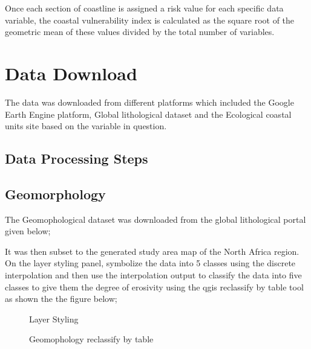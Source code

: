 \documentclass[letterpaper,10pt,english]{sphinxmanual}
\let\sphinxpxdimen\pdfpxdimen\else\newdimen\sphinxpxdimen
\begin{document}
\sphinxAtStartPar
Once each section of coastline is assigned a risk value for each specific data variable, the coastal vulnerability index is calculated as the square root of the geometric mean of these values divided by the total number of variables.


\section{Data Download}
\label{\detokenize{Preprocessing/CVI:data-download}}
\sphinxAtStartPar
The data was downloaded from different platforms which included the Google Earth Engine platform, Global lithological dataset and the Ecological coastal units site based on the variable in question.


\subsection{Data Processing Steps}
\label{\detokenize{Preprocessing/CVI:data-processing-steps}}

\subsection{Geomorphology}
\label{\detokenize{Preprocessing/CVI:geomorphology}}
\sphinxAtStartPar
The Geomophological dataset was downloaded from the global lithological portal given below;

\label{\detokenize{Preprocessing/CVI:datapreparationoverview}}
\sphinxAtStartPar
It was then subset to the generated study area map of the North Africa region.
On the layer styling panel, symbolize the data into 5 classes using the discrete interpolation and then use the interpolation output to classify the data into five classes to give them the degree of erosivity using the qgis reclassify by table tool as shown the the figure below;

\begin{figure}[H]
\centering
\capstart

\noindent{}
\caption{Layer Styling}\label{\detokenize{Preprocessing/CVI:id3}}\end{figure}

\begin{figure}[H]
\centering
\capstart

\noindent\sphinxincludegraphics[width=800\sphinxpxdimen,height=400\sphinxpxdimen]{{GEOM}.png}
\caption{Geomophology reclassify by table}\label{\detokenize{Preprocessing/CVI:id4}}\end{figure}
\end{document}
